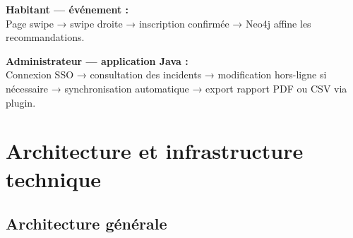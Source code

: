 \documentclass[12pt,a4paper]{article}
\begin{document}
\vspace{5pt}

\textbf{Habitant — événement :}\\
Page swipe → swipe droite → inscription confirmée → Neo4j affine les recommandations.

\vspace{5pt}

\textbf{Administrateur — application Java :}\\
Connexion SSO → consultation des incidents → modification hors-ligne si nécessaire →
synchronisation automatique → export rapport PDF ou CSV via plugin.

\newpage

\section{Architecture et infrastructure technique}

\subsection{Architecture générale}
\end{document}
